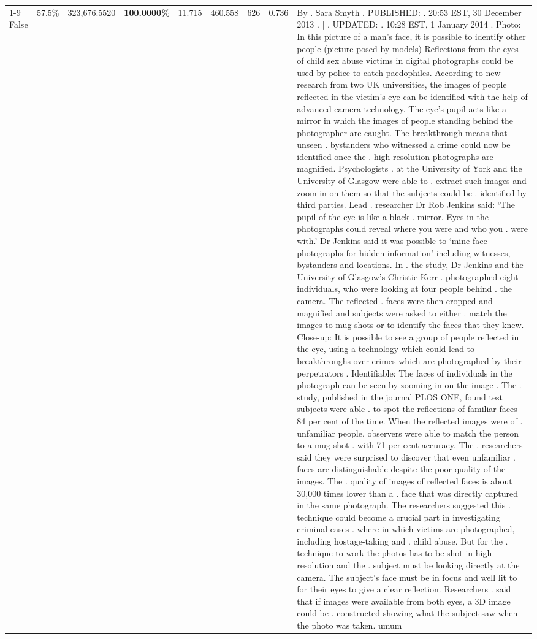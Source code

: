 \begin{table}[H]
\begin{tabular}{lllrlllll}
\cline{1-9}
False & 57.5\% & 323,676.5520 & \bfseries \color{red} 100.0000\% & 11.715 & 460.558 & 626 & 0.736 & By . Sara Smyth . PUBLISHED: . 20:53 EST, 30 December 2013 . | . UPDATED: . 10:28 EST, 1 January 2014 . Photo: In this picture of a man's face, it is possible to identify other people (picture posed by models) Reflections from the eyes of child sex abuse victims in digital photographs could be used by police to catch paedophiles. According to new research from two UK universities, the images of people reflected in the victim's eye can be identified with the help of advanced camera technology. The eye's pupil acts like a mirror in which the images of people standing behind the photographer are caught. The breakthrough means that unseen . bystanders who witnessed a crime could now be identified once the . high-resolution photographs are magnified. Psychologists . at the University of York and the University of Glasgow were able to . extract such images and zoom in on them so that the subjects could be . identified by third parties. Lead . researcher Dr Rob Jenkins said: ‘The pupil of the eye is like a black . mirror. Eyes in the photographs could reveal where you were and who you . were with.' Dr Jenkins said it was possible to ‘mine face photographs for hidden information' including witnesses, bystanders and locations. In . the study, Dr Jenkins and the University of Glasgow's Christie Kerr . photographed eight individuals, who were looking at four people behind . the camera. The reflected . faces were then cropped and magnified and subjects were asked to either . match the images to mug shots or to identify the faces that they knew. Close-up: It is possible to see a group of people reflected in the eye, using a technology which could lead to breakthroughs over crimes which are photographed by their perpetrators . Identifiable: The faces of individuals in the photograph can be seen by zooming in on the image . The . study, published in the journal PLOS ONE, found test subjects were able . to spot the reflections of familiar faces 84 per cent of the time. When the reflected images were of . unfamiliar people, observers were able to match the person to a mug shot . with 71 per cent accuracy. The . researchers said they were surprised to discover that even unfamiliar . faces are distinguishable despite the poor quality of the images. The . quality of images of reflected faces is about 30,000 times lower than a . face that was directly captured in the same photograph. The researchers suggested this . technique could become a crucial part in investigating criminal cases . where in which victims are photographed, including hostage-taking and . child abuse. But for the . technique to work the photos has to be shot in high-resolution and the . subject must be looking directly at the camera. The subject's face must be in focus and well lit to for their eyes to give a clear reflection. Researchers . said that if images were available from both eyes, a 3D image could be . constructed showing what the subject saw when the photo was taken. umum \\

\end{tabular}
\end{table}
